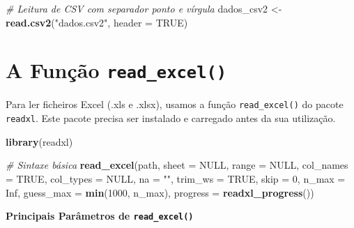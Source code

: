 \documentclass[
]{book}
\newenvironment{Shaded}{\begin{snugshade}}{\end{snugshade}}
\newcommand{\AttributeTok}[1]{\textcolor[rgb]{0.13,0.29,0.53}{#1}}
\newcommand{\CommentTok}[1]{\textcolor[rgb]{0.56,0.35,0.01}{\textit{#1}}}
\newcommand{\ConstantTok}[1]{\textcolor[rgb]{0.56,0.35,0.01}{#1}}
\newcommand{\DecValTok}[1]{\textcolor[rgb]{0.00,0.00,0.81}{#1}}
\newcommand{\FunctionTok}[1]{\textcolor[rgb]{0.13,0.29,0.53}{\textbf{#1}}}
\newcommand{\NormalTok}[1]{#1}
\newcommand{\OtherTok}[1]{\textcolor[rgb]{0.56,0.35,0.01}{#1}}
\newcommand{\StringTok}[1]{\textcolor[rgb]{0.31,0.60,0.02}{#1}}
\begin{document}
\begin{Shaded}
\begin{Highlighting}[]
\CommentTok{\# Leitura de CSV com separador ponto e vírgula}
\NormalTok{dados\_csv2 }\OtherTok{\textless{}{-}} \FunctionTok{read.csv2}\NormalTok{(}\StringTok{"dados.csv2"}\NormalTok{, }\AttributeTok{header =} \ConstantTok{TRUE}\NormalTok{)}
\end{Highlighting}
\end{Shaded}

\section{\texorpdfstring{A Função \texttt{read\_excel()}}{A Função read\_excel()}}\label{a-funuxe7uxe3o-read_excel}

Para ler ficheiros Excel (.xls e .xlsx), usamos a função \texttt{read\_excel()}
do pacote \texttt{readxl}. Este pacote precisa ser instalado e carregado antes
da sua utilização.

\begin{Shaded}
\begin{Highlighting}[]
\FunctionTok{library}\NormalTok{(readxl)}

\CommentTok{\# Sintaxe básica}
\FunctionTok{read\_excel}\NormalTok{(path, }\AttributeTok{sheet =} \ConstantTok{NULL}\NormalTok{, }\AttributeTok{range =} \ConstantTok{NULL}\NormalTok{, }\AttributeTok{col\_names =} \ConstantTok{TRUE}\NormalTok{,}
           \AttributeTok{col\_types =} \ConstantTok{NULL}\NormalTok{, }\AttributeTok{na =} \StringTok{""}\NormalTok{, }\AttributeTok{trim\_ws =} \ConstantTok{TRUE}\NormalTok{, }\AttributeTok{skip =} \DecValTok{0}\NormalTok{, }\AttributeTok{n\_max =} \ConstantTok{Inf}\NormalTok{,}
           \AttributeTok{guess\_max =} \FunctionTok{min}\NormalTok{(}\DecValTok{1000}\NormalTok{, n\_max), }\AttributeTok{progress =} \FunctionTok{readxl\_progress}\NormalTok{())}
\end{Highlighting}
\end{Shaded}

\textbf{Principais Parâmetros de \texttt{read\_excel()}}
\end{document}
